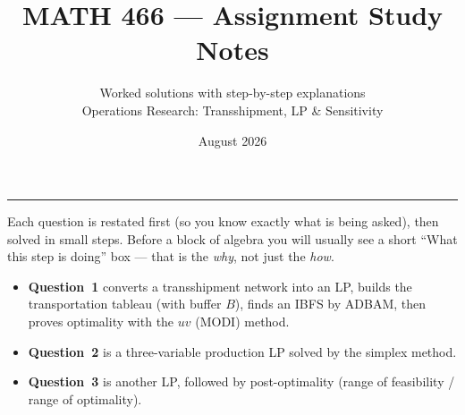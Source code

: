 \documentclass[11pt,a4paper]{article}
\title{\vspace{-1.2em}\bfseries\color{snPrimary} MATH 466 --- Assignment Study Notes}
\author{Worked solutions with step-by-step explanations\\[0.35em]
\large Operations Research: Transshipment, LP \& Sensitivity}
\date{August 2026}
\begin{document}
\maketitle

\begin{center}
\color{snRule}\rule{0.85\textwidth}{0.6pt}
\end{center}

\begin{ideabox}[title={How to read these notes}]
Each question is restated first (so you know exactly what is being asked), then solved
in small steps. Before a block of algebra you will usually see a short
``What this step is doing'' box --- that is the \emph{why}, not just the \emph{how}.

\begin{itemize}
  \item \textbf{Question~1} converts a transshipment network into an LP, builds the
        transportation tableau (with buffer \(B\)), finds an IBFS by ADBAM, then
        proves optimality with the \(uv\) (MODI) method.
  \item \textbf{Question~2} is a three-variable production LP solved by the simplex method.
  \item \textbf{Question~3} is another LP, followed by post-optimality
        (range of feasibility / range of optimality).
\end{itemize}
\end{ideabox}

\tableofcontents
\newpage


\newpage

\newpage

\newpage
\end{document}
